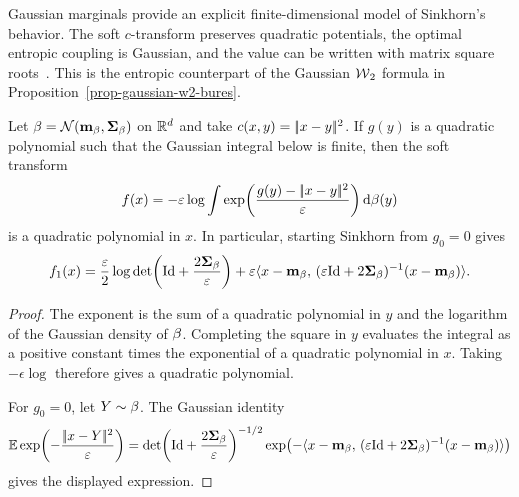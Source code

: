 Gaussian marginals provide an explicit finite-dimensional model of Sinkhorn's behavior. The soft $c$-transform preserves quadratic potentials, the optimal entropic coupling is Gaussian, and the value can be written with matrix square roots~\cite{janati2020gaussian}. This is the entropic counterpart of the Gaussian $\operatorname{\mathcal{W}}_2$ formula in Proposition~\ref{prop-gaussian-w2-bures}.

\begin{prop}\label{prop-gaussian-sinkhorn-closure}
	Let $\beta=\mathcal{N}(\mathbf{m}_\beta,\mathbf{\Sigma}_\beta)$ on $\mathbb{R}^d$ and take $c(x,y)=|\!| x-y |\!|^2$. If $g(y)$ is a quadratic polynomial such that the Gaussian integral below is finite, then the soft transform
	\[
		f(x)
		=
		-\varepsilon\log
		\int
		\exp\!\left(\frac{g(y)-|\!| x-y |\!|^2}{\varepsilon}\right)
		\mathrm{d}\beta(y)
	\]
	is a quadratic polynomial in $x$. In particular, starting Sinkhorn from $g_0=0$ gives
	\[
		f_1(x)
		=
		\frac{\varepsilon}{2}
		\log\det\!\left(\mathrm{Id}+\frac{2\mathbf{\Sigma}_\beta}{\varepsilon}\right)
		+
		\varepsilon
		\langle x-\mathbf{m}_\beta,\,(\varepsilon\mathrm{Id}+2\mathbf{\Sigma}_\beta)^{-1}(x-\mathbf{m}_\beta)\rangle.
	\]
\end{prop}

\begin{proof}
	The exponent is the sum of a quadratic polynomial in $y$ and the logarithm of the Gaussian density of $\beta$. Completing the square in $y$ evaluates the integral as a positive constant times the exponential of a quadratic polynomial in $x$. Taking $-\epsilon\log$ therefore gives a quadratic polynomial.

	For $g_0=0$, let $Y\sim\beta$. The Gaussian identity
	\[
		\mathbb{E}\exp\!\left(-\frac{|\!| x-Y |\!|^2}{\varepsilon}\right)
		=
		\det\!\left(\mathrm{Id}+\frac{2\mathbf{\Sigma}_\beta}{\varepsilon}\right)^{-1/2}
		\exp\!\left(
			-\langle x-\mathbf{m}_\beta,\,(\varepsilon\mathrm{Id}+2\mathbf{\Sigma}_\beta)^{-1}(x-\mathbf{m}_\beta)\rangle
		\right)
	\]
	gives the displayed expression.
\end{proof}

